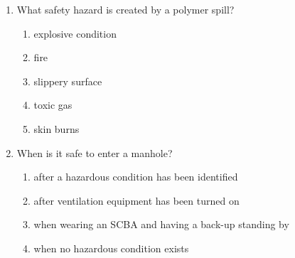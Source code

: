 \begin{enumerate}
\begin{enumerate}
\item What safety hazard is created by a polymer spill?
\begin{enumerate}
\item explosive condition 
\item fire
\item slippery surface 
\item toxic gas
\item skin burns
\end{enumerate}
\item When is it safe to enter a manhole?
\begin{enumerate}
\item after a hazardous condition has been identified
\item after ventilation equipment has been turned on
\item when wearing an SCBA and having a back-up standing by
\item when no hazardous condition exists
\end{enumerate}

\end{enumerate}








\end{enumerate}






